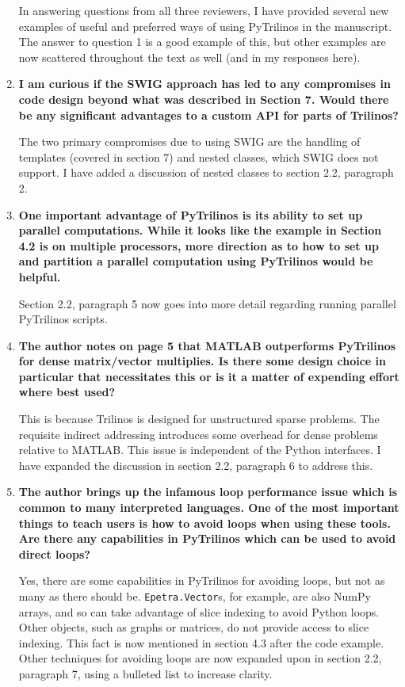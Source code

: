 \documentclass[11pt]{article}
\begin{document}
\begin{enumerate}
In answering questions from all three reviewers, I have provided several new examples of useful and preferred ways of using PyTrilinos in the manuscript.  The answer to question 1 is a good example of this, but other examples are now scattered throughout the text as well (and in my responses here).

\item {\bf I am curious if the SWIG approach has led to any compromises in code design beyond what was described in Section 7. Would there be any significant advantages to a custom API for parts of Trilinos?}

The two primary compromises due to using SWIG are the handling of templates (covered in section 7) and nested classes, which SWIG does not support.  I have added a discussion of nested classes to section 2.2, paragraph 2.

\item {\bf One important advantage of PyTrilinos is its ability to set up parallel computations. While it looks like the example in Section 4.2 is on multiple processors, more direction as to how to set up and partition a parallel computation using PyTrilinos would be helpful.}

Section 2.2, paragraph 5 now goes into more detail regarding running parallel PyTrilinos scripts.

\item {\bf The author notes on page 5 that MATLAB outperforms PyTrilinos for dense matrix/vector multiplies. Is there some design choice in particular that necessitates this or is it a matter of expending effort where best used?}

This is because Trilinos is designed for unstructured sparse problems.  The requisite indirect addressing introduces some overhead for dense problems relative to MATLAB.  This issue is independent of the Python interfaces.  I have expanded the discussion in section 2.2, paragraph 6 to address this.

\item {\bf The author brings up the infamous loop performance issue which is common to many interpreted languages. One of the most important things to teach users is how to avoid loops when using these tools. Are there any capabilities in PyTrilinos which can be used to avoid direct loops?}

Yes, there are some capabilities in PyTrilinos for avoiding loops, but not as many as there should be.  {\tt Epetra.Vector}s, for example, are also NumPy arrays, and so can take advantage of slice indexing to avoid Python loops.  Other objects, such as graphs or matrices, do not provide access to slice indexing.  This fact is now mentioned in section 4.3 after the code example.  Other techniques for avoiding loops are now expanded upon in section 2.2, paragraph 7, using a bulleted list to increase clarity.


\end{enumerate}
\end{document}
